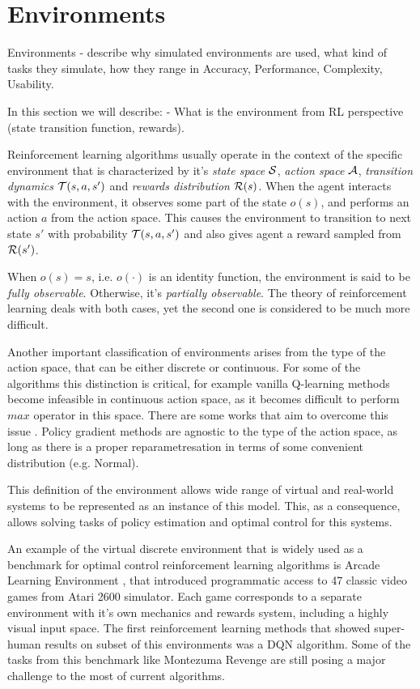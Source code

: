 \section{Environments}

Environments - describe why simulated environments are used, what kind of
tasks they simulate, how they range in Accuracy, Performance, Complexity,
Usability.

In this section we will describe:
- What is the environment from RL perspective (state transition function, rewards).

Reinforcement learning algorithms usually operate in the context of the specific
environment that is characterized by it's \emph{state space} $\mathcal{S}$,
\emph{action space} $\mathcal{A}$, \emph{transition dynamics} $\mathcal{T}(s, a, s')$ and
\emph{rewards distribution} $\mathcal{R}(s)$.
When the agent interacts with the environment, it observes some part of the state $o(s)$,
and performs an action $a$ from the action space. This causes the environment to transition to
next state $s'$ with probability $\mathcal{T}(s, a, s')$ and also gives agent a reward sampled
from $\mathcal{R}(s')$.

When $o(s) = s$, i.e. $o(\cdot)$ is an identity function, the environment is said to be
\emph{fully observable}. Otherwise, it's \emph{partially observable}. The theory of reinforcement
learning deals with both cases, yet the second one is considered to be much more difficult.

Another important classification of environments arises from the type of the action space,
that can be either discrete or continuous. For some of the algorithms this
distinction is critical, for example vanilla Q-learning methods become infeasible in
continuous action space, as it becomes difficult to perform $max$ operator in this space.
There are some works that aim to overcome this issue \cite{NAF}.
Policy gradient methods are agnostic to the type of the action space, as long as there is
a proper reparametresation in terms of some convenient distribution (e.g. Normal).

This definition of the environment allows wide range of virtual and real-world systems to be
represented as an instance of this model. This, as a consequence, allows solving tasks of policy
estimation and optimal control for this systems.

An example of the virtual discrete environment that is widely used as a benchmark for
optimal control reinforcement learning algorithms is Arcade Learning Environment \cite{ALE},
that introduced programmatic access to 47 classic video games from Atari 2600 simulator.
Each game corresponds to a separate environment with it's own mechanics and rewards system,
including a highly visual input space. The first reinforcement learning methods that showed
super-human results on subset of this environments was a DQN \cite{DQN} algorithm.
Some of the tasks from this benchmark like Montezuma Revenge are still posing a major
challenge to the most of current algorithms.

